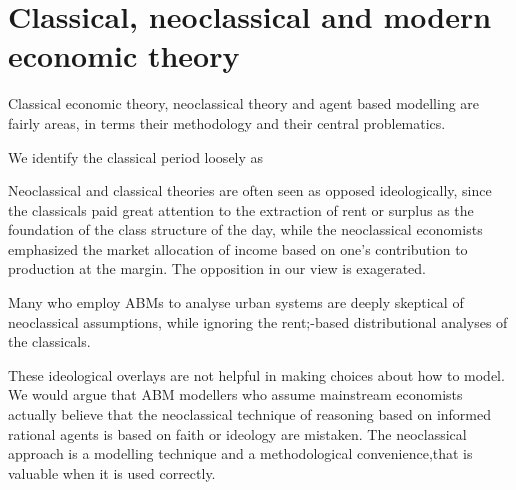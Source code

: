 {%


\section{Classical, neoclassical and modern economic theory} 

Classical economic theory, neoclassical theory and agent based modelling are  fairly areas, in terms their methodology and their central problematics. 

We identify the classical period loosely as 

Neoclassical and classical theories are often seen as opposed ideologically, since the classicals paid great attention to the extraction of rent or surplus  as the foundation of the class structure of the day, while the neoclassical  economists emphasized the market allocation of income based on one's contribution to production at the margin. The  opposition in our view is exagerated. 
 

Many  who employ ABMs to analyse urban systems are deeply skeptical of neoclassical assumptions, while ignoring the rent;-based distributional analyses of the classicals.

These ideological overlays are not helpful in making choices about how to model. We would argue that ABM modellers who assume mainstream economists actually believe that the neoclassical technique of reasoning based on informed rational agents is based on faith or ideology are mistaken. The neoclassical approach is a modelling technique and a  methodological convenience,that is valuable when it is used correctly.  

}
